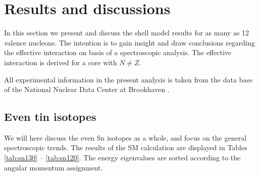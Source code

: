 \section{Results and discussions}

In this section we present and discuss the shell model results for as many 
as 12 valence nucleons. The intention is to gain insight and draw conclusions 
regarding the effective interaction on basis of a spectroscopic analysis. The
effective interaction is derived for a core with $N \neq Z$. 

All experimental information in the present analysis is taken from the data 
base of the National Nuclear Data Center at Brookhaven \cite{nndc}.


\subsection{Even tin isotopes}

We will here discuss the even Sn isotopes as a whole, and focus on the 
general spectroscopic trends. The results of the SM calculation are displayed
in Tables \ref{tab:sn130} -- \ref{tab:sn120}. The energy eigenvalues are
sorted according to the angular momentum assignment. 

